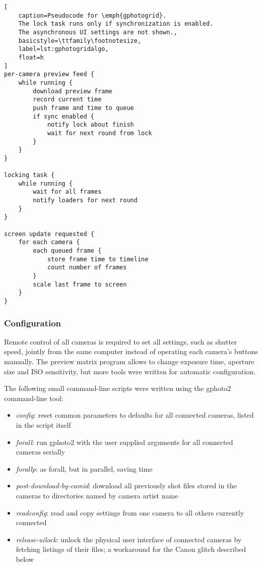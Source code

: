 \begin{lstlisting}[
	caption=Pseudocode for \emph{gphotogrid}.
	The lock task runs only if synchronization is enabled.
	The asynchronous UI settings are not shown.,
	basicstyle=\ttfamily\footnotesize,
	label=lst:gphotogridalgo,
	float=h
]
per-camera preview feed {
	while running {
		download preview frame
		record current time
		push frame and time to queue
		if sync enabled {
			notify lock about finish
			wait for next round from lock
		}
	}
}

locking task {
	while running {
		wait for all frames
		notify loaders for next round
	}
}

screen update requested {
	for each camera {
		each queued frame {
			store frame time to timeline
			count number of frames
		}
		scale last frame to screen
	}
}
\end{lstlisting}

\subsubsection{Configuration} %

Remote control of all cameras is required to set all settings, such as shutter speed, jointly from the same computer instead of operating each camera's buttons manually.
The preview matrix program allows to change exposure time, aperture size and ISO sensitivity, but more tools were written for automatic configuration.

The following small command-line scripts were written using the gphoto2 command-line tool:

\begin{itemize}
	\item \emph{config}: reset common parameters to defaults for all connected cameras, listed in the script itself
	\item \emph{forall}: run gphoto2 with the user supplied arguments for all connected cameras serially
	\item \emph{forallp}: as forall, but in parallel, saving time
	\item \emph{post-download-by-camid}: download all previously shot files stored in the cameras to directories named by camera artist name
	\item \emph{readconfig}: read and copy settings from one camera to all others currently connected
	\item \emph{release-uilock}: unlock the physical user interface of connected cameras by fetching listings of their files; a workaround for the Canon glitch described below
\end{itemize}

